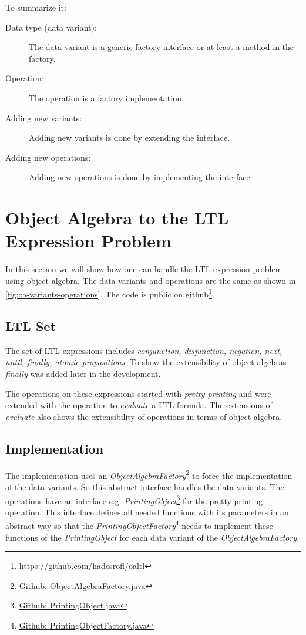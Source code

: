 \documentclass{llncs}
\begin{document}
To summarize it:

\begin{description}
	\item[Data type (data variant):] The data variant is a generic factory interface or at least a method in the factory.
	\item[Operation:] The operation is a factory implementation.
	\item[Adding new variants: ] Adding new variants is done by extending the interface.
	\item[Adding new operations:] Adding new operations is done by implementing the interface.
\end{description}


\section{Object Algebra to the LTL Expression Problem} \label{sec:oa-ltl}
In this section we will show how one can handle the LTL expression problem using object algebra. The data variants and operations are the same as shown in \autoref{fig:oa-variants-operations}. The code is public on github\footnote{\href{https://github.com/hadesrofl/oaltl}{https://github.com/hadesrofl/oaltl}}.

\subsection{LTL Set} \label{ssec:ltl-set}
The set of LTL expressions includes \emph{conjunction, disjunction, negation, next, until, finally, atomic propositions}. To show the extensibility of object algebras \emph{finally} was added later in the development.

The operations on these expressions started with \emph{pretty printing} and were extended with the operation to \emph{evaluate} a LTL formula. The extensions of \emph{evaluate} also shows the extensibility of operations in terms of object algebra.

\subsection{Implementation} \label{ssec:implementation}
The implementation uses an \emph{ObjectAlgebraFactory}\footnote{\href{https://github.com/hadesrofl/oaltl/blob/develop/src/main/java/de/uzl/hsr/oaltl/ObjectAlgebraFactory.java}{Github: ObjectAlgebraFactory.java}} to force the implementation of the data variants. So this abstract interface handles the data variants. The operations have an interface e.g. \emph{PrintingObject}\footnote{\href{https://github.com/hadesrofl/oaltl/blob/develop/src/main/java/de/uzl/hsr/oaltl/PrintingObject.java}{Github: PrintingObject.java}} for the pretty printing operation. This interface defines all needed functions with its parameters in an abstract way so that the \emph{PrintingObjectFactory}\footnote{\href{https://github.com/hadesrofl/oaltl/blob/develop/src/main/java/de/uzl/hsr/oaltl/PrintingObjectFactory.java}{Github: PrintingObjectFactory.java}} needs to implement these functions of the \emph{PrintingObject} for each data variant of the \emph{ObjectAlgebraFactory}. 
\end{document}
